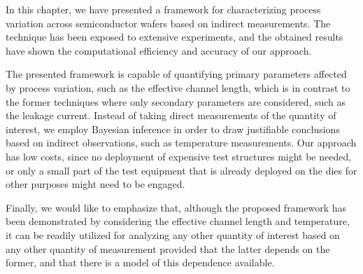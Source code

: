 In this chapter, we have presented a framework for characterizing process
variation across semiconductor wafers based on indirect measurements. The
technique has been exposed to extensive experiments, and the obtained results
have shown the computational efficiency and accuracy of our approach.

The presented framework is capable of quantifying primary parameters affected by
process variation, such as the effective channel length, which is in contrast to
the former techniques where only secondary parameters are considered, such as
the leakage current. Instead of taking direct measurements of the quantity of
interest, we employ Bayesian inference in order to draw justifiable conclusions
based on indirect observations, such as temperature measurements. Our approach
has low costs, since no deployment of expensive test structures might be needed,
or only a small part of the test equipment that is already deployed on the dies
for other purposes might need to be engaged.

Finally, we would like to emphasize that, although the proposed framework has
been demonstrated by considering the effective channel length and temperature,
it can be readily utilized for analyzing any other quantity of interest based on
any other quantity of measurement provided that the latter depends on the
former, and that there is a model of this dependence available.
